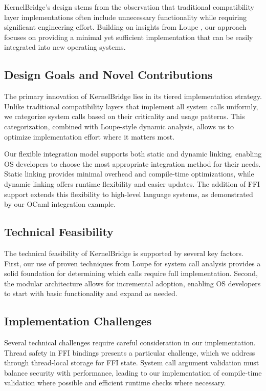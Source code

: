 \documentclass[conference]{IEEEtran}
\begin{document}
KernelBridge's design stems from the observation that traditional compatibility layer implementations often include unnecessary functionality while requiring significant engineering effort. Building on insights from Loupe \cite{lefeuvre2024loupe}, our approach focuses on providing a minimal yet sufficient implementation that can be easily integrated into new operating systems.

\subsection{Design Goals and Novel Contributions}
The primary innovation of KernelBridge lies in its tiered implementation strategy. Unlike traditional compatibility layers that implement all system calls uniformly, we categorize system calls based on their criticality and usage patterns. This categorization, combined with Loupe-style dynamic analysis, allows us to optimize implementation effort where it matters most.

Our flexible integration model supports both static and dynamic linking, enabling OS developers to choose the most appropriate integration method for their needs. Static linking provides minimal overhead and compile-time optimizations, while dynamic linking offers runtime flexibility and easier updates. The addition of FFI support extends this flexibility to high-level language systems, as demonstrated by our OCaml integration example.

\subsection{Technical Feasibility}
The technical feasibility of KernelBridge is supported by several key factors. First, our use of proven techniques from Loupe for system call analysis provides a solid foundation for determining which calls require full implementation. Second, the modular architecture allows for incremental adoption, enabling OS developers to start with basic functionality and expand as needed.

\subsection{Implementation Challenges}
Several technical challenges require careful consideration in our implementation. Thread safety in FFI bindings presents a particular challenge, which we address through thread-local storage for FFI state. System call argument validation must balance security with performance, leading to our implementation of compile-time validation where possible and efficient runtime checks where necessary.
\end{document}
